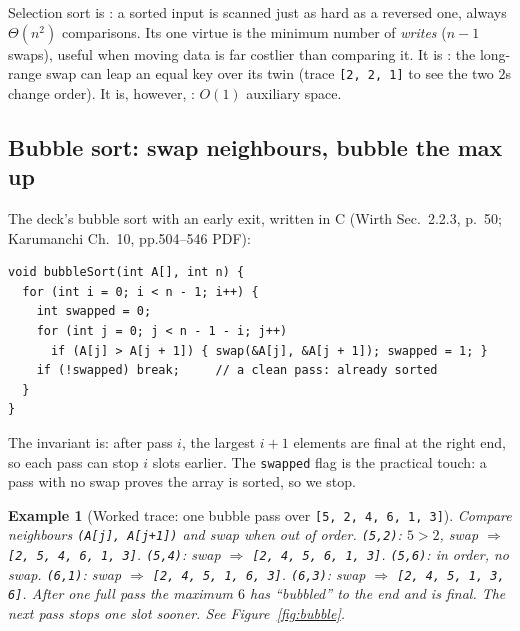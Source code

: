 \documentclass[11pt]{article}
\newtheorem{example}{Example}[section]
\begin{document}
Selection sort is : a sorted input is scanned just as hard as a reversed one, always $\Theta(n^2)$ comparisons. Its one virtue is the minimum number of \emph{writes} ($n-1$ swaps), useful when moving data is far costlier than comparing it. It is : the long-range swap can leap an equal key over its twin (trace \texttt{[2, 2, 1]} to see the two $2$s change order). It is, however, : $O(1)$ auxiliary space.

\subsection{Bubble sort: swap neighbours, bubble the max up}

The deck's bubble sort with an early exit, written in C (Wirth Sec.~2.2.3, p.~50; Karumanchi Ch.~10, pp.504--546 PDF):

{\footnotesize
\begin{verbatim}
void bubbleSort(int A[], int n) {
  for (int i = 0; i < n - 1; i++) {
    int swapped = 0;
    for (int j = 0; j < n - 1 - i; j++)
      if (A[j] > A[j + 1]) { swap(&A[j], &A[j + 1]); swapped = 1; }
    if (!swapped) break;     // a clean pass: already sorted
  }
}
\end{verbatim}
}

The invariant is: after pass $i$, the largest $i+1$ elements are final at the right end, so each pass can stop $i$ slots earlier. The \texttt{swapped} flag is the practical touch: a pass with no swap proves the array is sorted, so we stop.

\begin{example}[Worked trace: one bubble pass over \texttt{[5, 2, 4, 6, 1, 3]}]
Compare neighbours \texttt{(A[j], A[j+1])} and swap when out of order. \texttt{(5,2)}: $5 > 2$, swap $\Rightarrow$ \texttt{[2, 5, 4, 6, 1, 3]}. \texttt{(5,4)}: swap $\Rightarrow$ \texttt{[2, 4, 5, 6, 1, 3]}. \texttt{(5,6)}: in order, no swap. \texttt{(6,1)}: swap $\Rightarrow$ \texttt{[2, 4, 5, 1, 6, 3]}. \texttt{(6,3)}: swap $\Rightarrow$ \texttt{[2, 4, 5, 1, 3, 6]}. After one full pass the maximum $6$ has ``bubbled'' to the end and is final. The next pass stops one slot sooner. See Figure~\ref{fig:bubble}.
\end{example}
\end{document}
